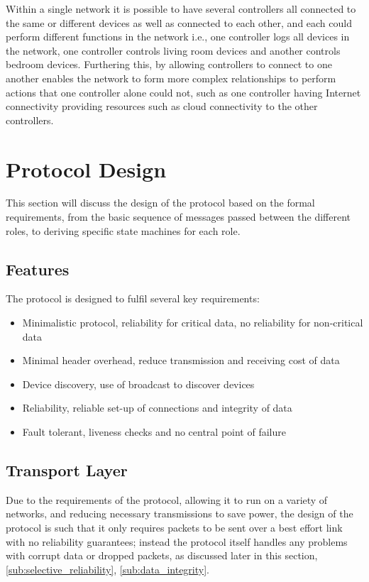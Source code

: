 Within a single network it is possible to have several controllers all connected to the same or different devices as well as connected to each other, and each could perform different functions in the network i.e., one controller logs all devices in the network, one controller controls living room devices and another controls bedroom devices. Furthering this, by allowing controllers to connect to one another enables the network to form more complex relationships to perform actions that one controller alone could not, such as one controller having Internet connectivity providing resources such as cloud connectivity to the other controllers.


\section{Protocol Design} %
\label{sec:protocol_design}
This section will discuss the design of the protocol based on the formal requirements, from the basic sequence of messages passed between the different roles, to deriving specific state machines for each role.

\subsection{Features} %
\label{sub:features}
The protocol is designed to fulfil several key requirements:
\begin{itemize}
	\item Minimalistic protocol, reliability for critical data, no reliability for non-critical data
	\item Minimal header overhead, reduce transmission and receiving cost of data
	\item Device discovery, use of broadcast to discover devices
	\item Reliability, reliable set-up of connections and integrity of data
	\item Fault tolerant, liveness checks and no central point of failure
\end{itemize}


\subsection{Transport Layer}
Due to the requirements of the protocol, allowing it to run on a variety of networks, and reducing necessary transmissions to save power, the design of the protocol is such that it only requires packets to be sent over a best effort link with no reliability guarantees; instead the protocol itself handles any problems with corrupt data or dropped packets, as discussed later in this section,\ref{sub:selective_reliability}, \ref{sub:data_integrity}. 

